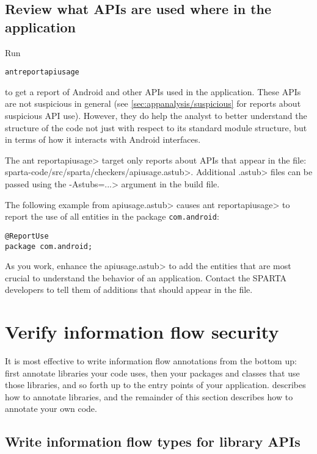 \subsection{Review what APIs are used where in the application}

Run

\begin{alltt}
  ant reportapiusage
\end{alltt}

\noindent
to get a report of Android and other APIs used in the application.
These APIs are not
suspicious in general (see \ref{sec:appanalysis/suspicious} for reports
about suspicious API use). However, they do help the analyst to better
understand the structure of the code not just with respect to its standard
module structure, but in terms of how it interacts with Android interfaces.

The
\<ant reportapiusage> target only reports about APIs that appear in the file:
\<sparta-code/src/sparta/checkers/apiusage.astub>.
Additional \<.astub> files can be passed using the \<-Astubs=...> argument in the
build file.

The following example from \<apiusage.astub> causes \<ant reportapiusage>
to report the use of all entities in the package 
\verb|com.android|:

\begin{Verbatim}
@ReportUse                                                         
package com.android;
\end{Verbatim}

As you work, enhance the \<apiusage.astub> to add the entities that are
most crucial to understand the behavior of an application.  Contact the
SPARTA developers to tell them of additions that should appear in the file.


\section{Verify information flow security\label{verify-information-flow-security}}

It is most effective to write information flow annotations from the bottom
up:  first annotate libraries your code uses, then your packages and
classes that use those libraries, and so forth up to the entry points of
your application.
 describes how to annotate libraries, and
the remainder of this section describes how to annotate your own code.


\subsection{Write information flow types for library APIs\label{flow-task-annotate-apis}}

